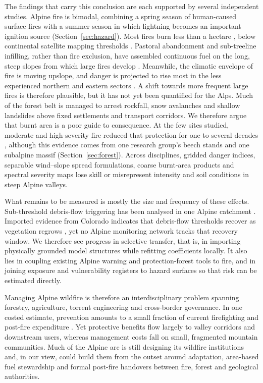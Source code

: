 \documentclass[11pt,a4paper]{article}
\begin{document}
The findings that carry this conclusion are each supported by several independent studies. Alpine fire is bimodal, combining a spring season of human-caused surface fires with a summer season in which lightning becomes an important ignition source (Section~\ref{sec:hazard}). Most fires burn less than a hectare \citep{muller_forest_2020}, below continental satellite mapping thresholds \citep{forrest_understanding_2024}. Pastoral abandonment and sub-treeline infilling, rather than fire exclusion, have assembled continuous fuel on the long, steep slopes from which large fires develop \citep{garbarino_contrasting_2020, frei_evidence_2023, conedera_linking_2024}. Meanwhile, the climatic envelope of fire is moving upslope, and danger is projected to rise most in the less experienced northern and eastern sectors \citep{beloiu_climatedriven_2026, gerberding_mapping_2025, miller_climate_2024}. A shift towards more frequent large fires is therefore plausible, but it has not yet been quantified for the Alps. Much of the forest belt is managed to arrest rockfall, snow avalanches and shallow landslides above fixed settlements and transport corridors. We therefore argue that burnt area is a poor guide to consequence. At the few sites studied, moderate and high-severity fire reduced that protection for one to several decades \citep{maringer_temporal_2016, gehring_shallow_2019, degiuli_arrested_2024}, although this evidence comes from one research group's beech stands and one subalpine massif (Section~\ref{sec:forest}). Across disciplines, gridded danger indices, separable wind--slope spread formulations, coarse burnt-area products and spectral severity maps lose skill or misrepresent intensity and soil conditions in steep Alpine valleys.

What remains to be measured is mostly the size and frequency of these effects. Sub-threshold debris-flow triggering has been analysed in one Alpine catchment \citep{laporta_postwildfire_2025}. Imported evidence from Colorado indicates that debris-flow thresholds recover as vegetation regrows \citep{rengers_evaluating_2024}, yet no Alpine monitoring network tracks that recovery window. We therefore see progress in selective transfer, that is, in importing physically grounded model structures while refitting coefficients locally. It also lies in coupling existing Alpine warning and protection-forest tools to fire, and in joining exposure and vulnerability registers to hazard surfaces so that risk can be estimated directly.

Managing Alpine wildfire is therefore an interdisciplinary problem spanning forestry, agriculture, torrent engineering and cross-border governance. In one costed estimate, prevention amounts to a small fraction of current firefighting and post-fire expenditure \citep{muller_forest_2020}. Yet protective benefits flow largely to valley corridors and downstream users, whereas management costs fall on small, fragmented mountain communities. Much of the Alpine arc is still designing its wildfire institutions and, in our view, could build them from the outset around adaptation, area-based fuel stewardship and formal post-fire handovers between fire, forest and geological authorities.
\end{document}
